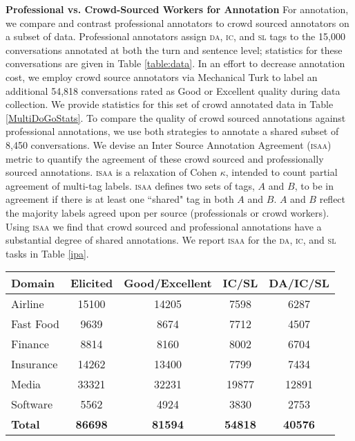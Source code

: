 {{	\textbf{Professional vs. Crowd-Sourced Workers for Annotation}
	For annotation, we compare and contrast professional annotators to crowd sourced annotators on a subset of data. Professional annotators assign \textsc{da}, \textsc{ic}, and \textsc{sl} tags to the 15,000 conversations annotated at both the turn and sentence level; statistics for these conversations are given in Table \ref{table:data}. In an effort to decrease annotation cost, we employ crowd source annotators via Mechanical Turk to label an additional 54,818 conversations rated as Good or Excellent quality during data collection. We provide statistics for this set of crowd annotated data in Table \ref{MultiDoGoStats}. To compare the quality of crowd sourced annotations against professional annotations, we use both strategies to annotate a shared subset of 8,450 conversations. 
	We devise an Inter Source Annotation Agreement (\textsc{isaa}) metric to quantify the agreement of these crowd sourced and professionally sourced annotations. 
	\textsc{isaa} is a relaxation of Cohen $\kappa$, intended to count partial agreement of multi-tag labels. 
	\textsc{isaa} defines two sets of tags, $A$ and $B$, to be in agreement if there is at least one ``shared" tag in both $A$ and $B$. $A$ and $B$ reflect the majority labels agreed upon per source (professionals or crowd workers). Using \textsc{isaa} we find that crowd sourced and professional annotations have a substantial degree of shared annotations. We report \textsc{isaa} for the \textsc{da}, \textsc{ic}, and \textsc{sl} tasks in Table \ref{ipa}. 

\begin{table*}[t!]
	\centering
	\small
	\begin{tabular}{ l  c c c c }
		\textbf{Domain} & \textbf{Elicited} & \textbf{Good/Excellent} & \textbf{IC/SL} & \textbf{DA/IC/SL}\\
		\hline
		
		Airline & 15100&14205 & 7598& 6287 \\
		Fast Food & 9639& 8674&7712& 4507 \\
		Finance & 8814& 8160& 8002& 6704 \\
		Insurance &14262 &13400 & 7799& 7434 \\
		Media & 33321& 32231& 19877& 12891  \\
		Software &5562& 4924& 3830& 2753 \\
		\hline
		\textbf{Total} &\textbf{86698} & \textbf{81594}& \textbf{54818}& \textbf{40576} \\
	\end{tabular}
	\caption{Total number of conversations per domain: raw conversations Elicited; Good/Excellent is the total number of conversations rated as such by the agent annotators; (IC/SL) is the number of conversations annotated for Intent Classes and Slot Labels only; (DA/IC/SL) is the total number of conversations annotated for Dialogue Acts, Intent Classes, and Slot Labels.} %
	\label{MultiDoGoStats}
\end{table*}

}}
